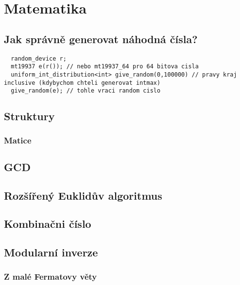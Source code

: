 \documentclass[10pt, a4paper]{article}
\begin{document}
\newpage

\section{Matematika}

\subsection{Jak správně generovat náhodná čísla?}
\begin{lstlisting}
  random_device r;
  mt19937 e(r()); // nebo mt19937_64 pro 64 bitova cisla
  uniform_int_distribution<int> give_random(0,100000) // pravy kraj inclusive (kdybychom chteli generovat intmax)
  give_random(e); // tohle vraci random cislo
\end{lstlisting}

\subsection{Struktury}
\subsubsection{Matice}


\subsection{GCD}


\subsection{Rozšířený Euklidův algoritmus}


\subsection{Kombinačni číslo}


\subsection{Modularní inverze}


\subsubsection{Z malé Fermatovy věty}

\end{document}
